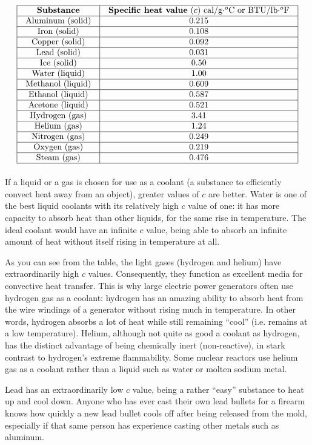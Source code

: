 $$\vbox{\offinterlineskip
\halign{\strut
\vrule \quad\hfil # \ \hfil & 
\vrule \quad\hfil # \ \hfil \vrule \cr
\noalign{\hrule}
%
\textbf{Substance} & \textbf{Specific heat value} ($c$) cal/g$\cdot$$^{o}$C or BTU/lb$\cdot$$^{o}$F \cr
%
\noalign{\hrule}
%
Aluminum (solid) & 0.215 \cr
%
\noalign{\hrule}
%
Iron (solid) & 0.108 \cr
%
\noalign{\hrule}
%
Copper (solid) & 0.092 \cr
%
\noalign{\hrule}
%
Lead (solid) & 0.031 \cr
%
\noalign{\hrule}
%
Ice (solid) & 0.50 \cr
%
\noalign{\hrule}
%
Water (liquid) & 1.00 \cr
%
\noalign{\hrule}
%
Methanol (liquid) & 0.609 \cr
%
\noalign{\hrule}
%
Ethanol (liquid) & 0.587 \cr
%
\noalign{\hrule}
%
Acetone (liquid) & 0.521 \cr
%
\noalign{\hrule}
%
Hydrogen (gas) & 3.41 \cr
%
\noalign{\hrule}
%
Helium (gas) & 1.24 \cr
%
\noalign{\hrule}
%
Nitrogen (gas) & 0.249 \cr
%
\noalign{\hrule}
%
Oxygen (gas) & 0.219 \cr
%
\noalign{\hrule}
%
Steam (gas) & 0.476 \cr
%
\noalign{\hrule}
} %
}$$ %

If a liquid or a gas is chosen for use as a coolant (a substance to efficiently convect heat away from an object), greater values of $c$ are better.  Water is one of the best liquid coolants with its relatively high $c$ value of one: it has more capacity to absorb heat than other liquids, for the same rise in temperature.  The ideal coolant would have an infinite $c$ value, being able to absorb an infinite amount of heat without itself rising in temperature at all.  

As you can see from the table, the light gases (hydrogen and helium) have extraordinarily high $c$ values.  Consequently, they function as excellent media for convective heat transfer.  This is why large electric power generators often use hydrogen gas as a coolant: hydrogen has an amazing ability to absorb heat from the wire windings of a generator without rising much in temperature.  In other words, hydrogen absorbs a lot of heat while still remaining ``cool'' (i.e. remains at a low temperature).  Helium, although not quite as good a coolant as hydrogen, has the distinct advantage of being chemically inert (non-reactive), in stark contrast to hydrogen's extreme flammability.  Some nuclear reactors use helium gas as a coolant rather than a liquid such as water or molten sodium metal.

Lead has an extraordinarily low $c$ value, being a rather ``easy'' substance to heat up and cool down.  Anyone who has ever cast their own lead bullets for a firearm knows how quickly a new lead bullet cools off after being released from the mold, especially if that same person has experience casting other metals such as aluminum.

